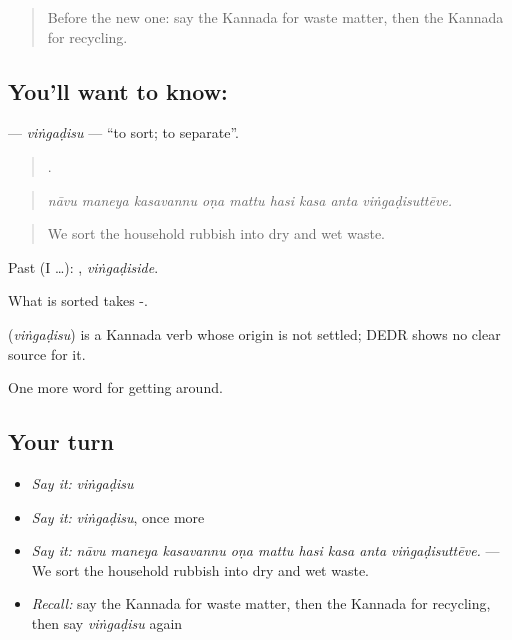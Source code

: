 \label{lesson:KA-C474-vingadisu}



\begin{quote}
Before the new one: say the Kannada for waste matter, then the Kannada for recycling.
\end{quote}

\subsection*{You'll want to know: }
\textbf{} — \emph{viṅgaḍisu} — \textquotedblleft{}to sort; to separate\textquotedblright{}.

\begin{quote}
        .
\end{quote}

\begin{quote}
\emph{nāvu maneya kasavannu oṇa mattu hasi kasa anta viṅgaḍisuttēve.}
\end{quote}

\begin{quote}
We sort the household rubbish into dry and wet waste.
\end{quote}

Past (I …): , \emph{viṅgaḍiside}.

What is sorted takes -.

\begin{cousinweb}
\textbf{} (\emph{viṅgaḍisu}) is a Kannada verb whose origin is not settled; DEDR shows no clear source for it.
\end{cousinweb}

\begin{grammarlens}[title={What you've built}]
One more word for getting around.
\end{grammarlens}

\subsection*{Your turn}
\begin{itemize}
\raggedright
  \item \emph{Say it:} \emph{viṅgaḍisu}
  \item \emph{Say it:} \emph{viṅgaḍisu}, once more
  \item \emph{Say it:} \emph{nāvu maneya kasavannu oṇa mattu hasi kasa anta viṅgaḍisuttēve.} — We sort the household rubbish into dry and wet waste.
  \item \emph{Recall:} say the Kannada for waste matter, then the Kannada for recycling, then say \emph{viṅgaḍisu} again
\end{itemize}

